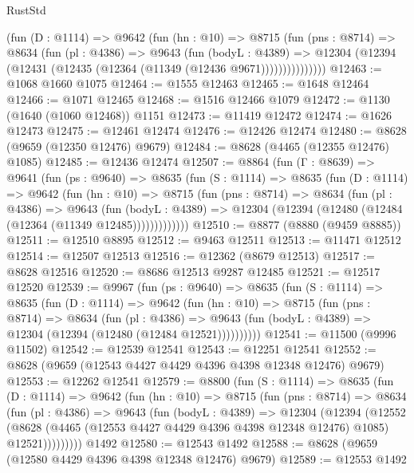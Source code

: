 \begin{lexlean}{RustStd}
\begin{coremodule}
            (fun (D : @1114) =>
            @9642
              (fun (hn : @10) =>
              @8715
                (fun (pns : @8714) =>
                @8634
                  (fun (pl : @4386) =>
                  @9643
                    (fun (bodyL : @4389) =>
                    @12304 (@12394 (@12431 (@12435 (@12364 (@11349 (@12436 @9671)))))))))))))))
@12463 := @1068 @1660 @1075
@12464 := @1555 @12463
@12465 := @1648 @12464
@12466 := @1071 @12465
@12468 := @1516 @12466 @1079
@12472 := @1130 (@1640 (@1060 @12468)) @1151
@12473 := @11419 @12472
@12474 := @1626 @12473
@12475 := @12461 @12474
@12476 := @12426 @12474
@12480 := @8628 (@9659 (@12350 @12476) @9679)
@12484 := @8628 (@4465 (@12355 @12476) @1085)
@12485 := @12436 @12474
@12507 := @8864
    (fun (Γ : @8639) =>
    @9641
      (fun (ps : @9640) =>
      @8635
        (fun (S : @1114) =>
        @8635
          (fun (D : @1114) =>
          @9642
            (fun (hn : @10) =>
            @8715
              (fun (pns : @8714) =>
              @8634
                (fun (pl : @4386) =>
                @9643
                  (fun (bodyL : @4389) =>
                  @12304 (@12394 (@12480 (@12484 (@12364 (@11349 @12485)))))))))))))
@12510 := @8877 (@8880 (@9459 @8885))
@12511 := @12510 @8895
@12512 := @9463 @12511
@12513 := @11471 @12512
@12514 := @12507 @12513
@12516 := @12362 (@8679 @12513)
@12517 := @8628 @12516
@12520 := @8686 @12513 @9287 @12485
@12521 := @12517 @12520
@12539 := @9967
    (fun (ps : @9640) =>
    @8635
      (fun (S : @1114) =>
      @8635
        (fun (D : @1114) =>
        @9642
          (fun (hn : @10) =>
          @8715
            (fun (pns : @8714) =>
            @8634
              (fun (pl : @4386) =>
              @9643 (fun (bodyL : @4389) => @12304 (@12394 (@12480 (@12484 @12521))))))))))
@12541 := @11500 (@9996 @11502)
@12542 := @12539 @12541
@12543 := @12251 @12541
@12552 := @8628 (@9659 (@12543 @4427 @4429 @4396 @4398 @12348 @12476) @9679)
@12553 := @12262 @12541
@12579 := @8800
    (fun (S : @1114) =>
    @8635
      (fun (D : @1114) =>
      @9642
        (fun (hn : @10) =>
        @8715
          (fun (pns : @8714) =>
          @8634
            (fun (pl : @4386) =>
            @9643
              (fun (bodyL : @4389) =>
              @12304
                (@12394
                  (@12552
                    (@8628
                      (@4465 (@12553 @4427 @4429 @4396 @4398 @12348 @12476) @1085)
                      @12521)))))))))
    @1492
@12580 := @12543 @1492
@12588 := @8628 (@9659 (@12580 @4429 @4396 @4398 @12348 @12476) @9679)
@12589 := @12553 @1492

\end{coremodule}
\end{lexlean}
